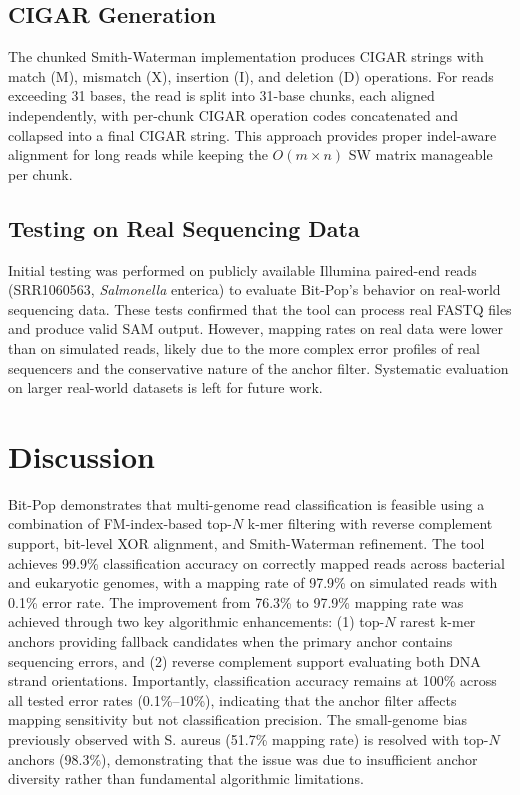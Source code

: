 \documentclass[utf8]{article}
\begin{document}
\subsection{CIGAR Generation}

The chunked Smith-Waterman implementation produces CIGAR strings with match (M), mismatch (X), insertion (I), and deletion (D) operations. For reads exceeding 31 bases, the read is split into 31-base chunks, each aligned independently, with per-chunk CIGAR operation codes concatenated and collapsed into a final CIGAR string. This approach provides proper indel-aware alignment for long reads while keeping the $O(m \times n)$ SW matrix manageable per chunk.

\subsection{Testing on Real Sequencing Data}

Initial testing was performed on publicly available Illumina paired-end reads (SRR1060563, \textit{Salmonella} enterica) to evaluate Bit-Pop's behavior on real-world sequencing data. These tests confirmed that the tool can process real FASTQ files and produce valid SAM output. However, mapping rates on real data were lower than on simulated reads, likely due to the more complex error profiles of real sequencers and the conservative nature of the anchor filter. Systematic evaluation on larger real-world datasets is left for future work.

\section{Discussion}

Bit-Pop demonstrates that multi-genome read classification is feasible using a combination of FM-index-based top-$N$ k-mer filtering with reverse complement support, bit-level XOR alignment, and Smith-Waterman refinement. The tool achieves 99.9\% classification accuracy on correctly mapped reads across bacterial and eukaryotic genomes, with a mapping rate of 97.9\% on simulated reads with 0.1\% error rate. The improvement from 76.3\% to 97.9\% mapping rate was achieved through two key algorithmic enhancements: (1) top-$N$ rarest k-mer anchors providing fallback candidates when the primary anchor contains sequencing errors, and (2) reverse complement support evaluating both DNA strand orientations. Importantly, classification accuracy remains at 100\% across all tested error rates (0.1\%--10\%), indicating that the anchor filter affects mapping sensitivity but not classification precision. The small-genome bias previously observed with S. aureus (51.7\% mapping rate) is resolved with top-$N$ anchors (98.3\%), demonstrating that the issue was due to insufficient anchor diversity rather than fundamental algorithmic limitations.
\end{document}

